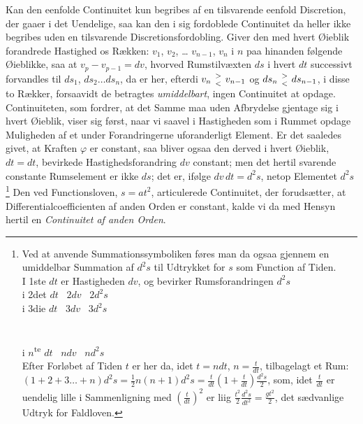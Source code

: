 \documentclass[12pt,a4paper]{book}
\begin{document}
Kan den eenfolde Continuitet kun begribes af en tilsvarende
eenfold Discretion, der gaaer i det Uendelige, saa
kan den i sig fordoblede Continuitet da heller ikke begribes
uden en tilsvarende Discretionsfordobling. Giver den med
hvert Øieblik forandrede Hastighed os Rækken: $v_1$, $v_2$, \ldots
\setcounter{footnote}{0}
$v_{n-1}$, $v_n$ i $n$ paa hinanden følgende Øieblikke, saa at
$v_p - v_{p-1} = dv$, hvorved Rumstilvæxten $ds$ i hvert $dt$
successivt forvandles til $ds_1$, $ds_2 \ldots ds_n$, da er her,
efterdi $v_n \mathrel{{>}\atop{<}} v_{n-1}$ og
$ds_n \mathrel{{>}\atop{<}} ds_{n-1}$, i disse to Rækker,
forsaavidt de betragtes \emph{umiddelbart}, ingen Continuitet at
opdage. Continuiteten, som fordrer, at det Samme maa uden
Afbrydelse gjentage sig i hvert Øieblik, viser sig først, naar
vi saavel i Hastigheden som i Rummet opdage Muligheden af et
under Forandringerne uforanderligt Element. Er det saaledes
givet, at Kraften $\varphi$ er constant, saa bliver ogsaa den derved
i hvert Øieblik, $dt = dt$, bevirkede Hastighedsforandring $dv$
constant; men det hertil svarende constante Rumselement er
ikke $ds$; det er, ifølge $dv\,dt = d^2s$, netop Elementet
$d^2s$\footnote{Ved at anvende Summationssymboliken føres man da
ogsaa gjennem en umiddelbar Summation af $d^2s$ til Udtrykket
for $s$ som Function af Tiden.\\
I 1ste $dt$ er Hastigheden $dv$, og bevirker Rumsforandringen $d^2s$\\
i 2det $dt$ \dotfill\ $2dv$ \dotfill\ $2d^2s$\\
i 3die $dt$ \dotfill\ $3dv$ \dotfill\ $3d^2s$\\
\leavevmode\dotfill\\
\leavevmode\dotfill\\
i $n$\textsuperscript{te} $dt$ \dotfill\ $ndv$ \dotfill\ $nd^2s$\\
Efter Forløbet af Tiden $t$ er her da, idet $t = ndt$,
$n = \frac{t}{dt}$, tilbagelagt et Rum:
$(1 + 2 + 3 \ldots + n)d^2s = \frac{1}{2}n(n+1)d^2s
= \frac{t}{dt}\left(1 + \frac{t}{dt}\right)\frac{d^2s}{2}$,
som, idet $\frac{t}{dt}$ er uendelig lille i Sammenligning med
$\left(\frac{t}{dt}\right)^2$ er liig
$\frac{t^2}{2}\frac{d^2s}{dt^2} = \frac{gt^2}{2}$, det
sædvanlige Udtryk for Faldloven.} Den ved Functionsloven,
$s = at^2$, articulerede Continuitet,
der forudsætter, at Differentialcoefficienten af anden
Orden er constant, kalde vi da med Hensyn hertil en
\emph{Continuitet af anden Orden}.
\setcounter{footnote}{0}
\end{document}
